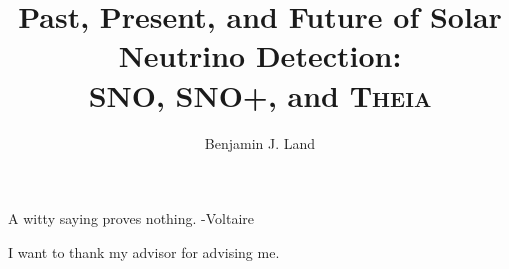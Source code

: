 \documentclass[12pt,letterpaper,oldfontcommands]{ucbthesis}
\begin{document}
\newcommand{\Li}{$^{8}$Li }
\newcommand{\N}{$^{16}$N }
\newcommand{\B}{$^{8}$B }

\title{Past, Present, and Future of Solar Neutrino Detection:\\SNO, SNO+, and \textsc{Theia}}
\author{Benjamin J. Land}
\maketitle
\approvalpage
\copyrightpage



\begin{frontmatter}

\begin{dedication}
\null\vfil
\begin{center}
A witty saying proves nothing. -Voltaire
\end{center}
\vfil\null
\end{dedication}

\tableofcontents
\clearpage
\listoffigures
\clearpage
\listoftables

\begin{acknowledgements}
I want to thank my advisor for advising me.
\end{acknowledgements}

\end{frontmatter}

\pagestyle{headings}








\appendix





\printbibliography
\end{document}
